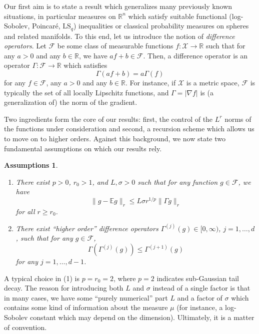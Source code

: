 \documentclass[a4paper,12pt]{amsart}
\numberwithin{equation}{section}
\newtheorem{assumptions}[satz]{Assumptions}
\theoremstyle{remark}
\def\E{{\mathbb E}}
\def\R{{\mathbb R}}
\begin{document}
Our first aim is to state a result which generalizes many previously known situations, in particular measures on $\R^n$ which satisfy suitable functional (log-Sobolev, Poincar\'{e}, $\mathrm{LS}_q$) inequalities or classical probability measures on spheres and related manifolds. To this end, let us introduce the notion of \emph{difference operators}. Let $\mathcal{F}$ be some class of measurable functions $f \colon \mathcal{X} \to \R$ such that for any $a > 0$ and any $b \in \R$, we have $af+b \in \mathcal{F}$. Then, a difference operator is an operator $\Gamma \colon \mathcal{F} \to \R$ which satisfies
\begin{equation}\label{eq:DiffOp}
\Gamma(af+b) = a\Gamma(f)
\end{equation}
for any $f \in \mathcal{F}$, any $a > 0$ and any $b \in \R$. For instance, if $\mathcal{X}$ is a metric space, $\mathcal{F}$ is typically the set of all locally Lipschitz functions, and $\Gamma = |\nabla f|$ is (a generalization of) the norm of the gradient.

Two ingredients form the core of our results: first, the control of the $L^r$ norms of the functions under consideration and second, a recursion scheme which allows us to move on to higher orders. Against this background, we now state two fundamental assumptions on which our results rely.

\begin{assumptions}\label{ass:Set1}
\begin{enumerate}
\item There exist $p > 0$, $r_0 > 1$, and $L, \sigma > 0$ such that for any function $g \in \mathcal{F}$, we have
\begin{equation*}
	\lVert g - \E g \rVert_r \le L\sigma r^{1/p} \lVert \Gamma g \rVert_r
\end{equation*}
for all $r \ge r_0$.
\item There exist ``higher order'' difference operators $\Gamma^{(j)}(g) \in [0,\infty)$, $j = 1, \ldots, d$, such that for any $g \in \mathcal{F}$,
\begin{equation*}
	\Gamma (\Gamma^{(j)}(g)) \le \Gamma^{(j+1)}(g)
\end{equation*}
for any $j = 1, \ldots, d-1$.
\end{enumerate}
\end{assumptions}

A typical choice in (1) is $p=r_0=2$, where $p=2$ indicates sub-Gaussian tail decay. The reason for introducing both $L$ and $\sigma$ instead of a single factor is that in many cases, we have some ``purely numerical'' part $L$ and a factor of $\sigma$ which contains some kind of information about the measure $\mu$ (for instance, a log-Sobolev constant which may depend on the dimension). Ultimately, it is a matter of convention.
\end{document}
